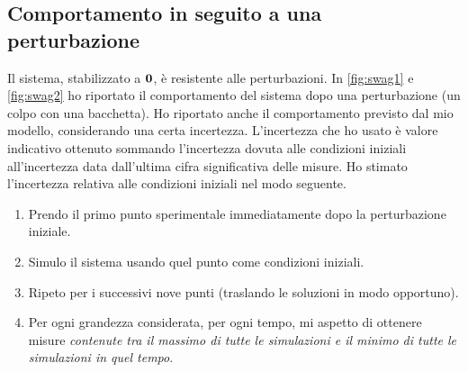 \subsection{Comportamento in seguito a una perturbazione}
Il sistema, stabilizzato a $\mathbf{0}$, è resistente alle perturbazioni.
In \autoref{fig:swag1} e \autoref{fig:swag2} ho riportato il
comportamento del sistema dopo una perturbazione (un colpo con
una bacchetta).
Ho riportato anche il comportamento previsto dal mio modello,
considerando una certa incertezza.
L'incertezza che ho usato è valore indicativo ottenuto sommando l'incertezza
dovuta alle condizioni iniziali all'incertezza data dall'ultima cifra significativa
delle misure.
Ho stimato l'incertezza relativa alle condizioni iniziali nel modo seguente.
\begin{enumerate}
    \item Prendo il primo punto sperimentale immediatamente dopo la perturbazione iniziale.
    \item Simulo il sistema usando quel punto come condizioni iniziali.
    \item Ripeto per i successivi nove punti (traslando
    le soluzioni in modo opportuno).
    \item Per ogni grandezza considerata, per ogni tempo, mi aspetto di ottenere
    misure \emph{contenute tra il massimo di tutte le simulazioni e il minimo di 
    tutte le simulazioni in quel tempo}.
\end{enumerate}



